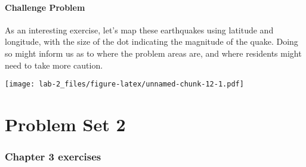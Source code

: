 \documentclass[]{article}
\newenvironment{Shaded}{\begin{snugshade}}{\end{snugshade}}
\newcommand{\KeywordTok}[1]{\textcolor[rgb]{0.13,0.29,0.53}{\textbf{#1}}}
\newcommand{\DataTypeTok}[1]{\textcolor[rgb]{0.13,0.29,0.53}{#1}}
\newcommand{\DecValTok}[1]{\textcolor[rgb]{0.00,0.00,0.81}{#1}}
\newcommand{\FloatTok}[1]{\textcolor[rgb]{0.00,0.00,0.81}{#1}}
\newcommand{\StringTok}[1]{\textcolor[rgb]{0.31,0.60,0.02}{#1}}
\newcommand{\OperatorTok}[1]{\textcolor[rgb]{0.81,0.36,0.00}{\textbf{#1}}}
\newcommand{\NormalTok}[1]{#1}
\let\oldparagraph\paragraph
\renewcommand{\paragraph}[1]{\oldparagraph{#1}\mbox{}}
\begin{document}
\newpage

\paragraph{Challenge Problem}\label{challenge-problem}

As an interesting exercise, let's map these earthquakes using latitude
and longitude, with the size of the dot indicating the magnitude of the
quake. Doing so might inform us as to where the problem areas are, and
where residents might need to take more caution.

\begin{Shaded}
\end{Shaded}

\texttt{[image: lab-2\_files/figure-latex/unnamed-chunk-12-1.pdf]}

\newpage

\section{Problem Set 2}\label{problem-set-2}

\subsubsection{Chapter 3 exercises}\label{chapter-3-exercises}
\end{document}
